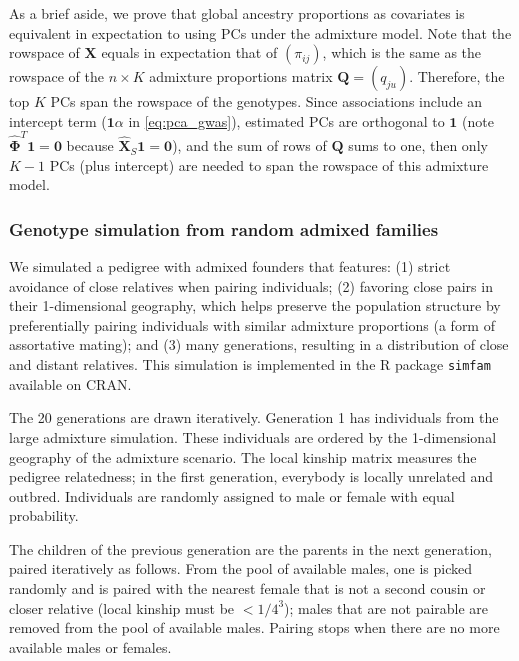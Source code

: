 \documentclass[11pt]{article}
\begin{document}
As a brief aside, we prove that global ancestry proportions as covariates is equivalent in expectation to using PCs under the admixture model.
Note that the rowspace of $\mathbf{X}$ equals in expectation that of $(\pi_{ij})$, which is the same as the rowspace of the $n \times K$ admixture proportions matrix $\mathbf{Q} = (q_{ju})$.
Therefore, the top $K$ PCs span the rowspace of the genotypes.
Since associations include an intercept term ($\mathbf{1} \alpha$ in \cref{eq:pca_gwas}), estimated PCs are orthogonal to $\mathbf{1}$ (note $\mathbf{\hat{\Phi}}^T \mathbf{1} = \mathbf{0}$ because $\mathbf{\hat{X}}_S \mathbf{1} = \mathbf{0}$), and the sum of rows of $\mathbf{Q}$ sums to one, then only $K-1$ PCs (plus intercept) are needed to span the rowspace of this admixture model.

\subsubsection{Genotype simulation from random admixed families}

We simulated a pedigree with admixed founders that features:
(1) strict avoidance of close relatives when pairing individuals;
(2) favoring close pairs in their 1-dimensional geography, which helps preserve the population structure by preferentially pairing individuals with similar admixture proportions (a form of assortative mating); and
(3) many generations, resulting in a distribution of close and distant relatives.
This simulation is implemented in the R package \texttt{simfam} available on CRAN.

The 20 generations are drawn iteratively.
Generation 1 has individuals from the large admixture simulation.
These individuals are ordered by the 1-dimensional geography of the admixture scenario.
The local kinship matrix measures the pedigree relatedness; in the first generation, everybody is locally unrelated and outbred.
Individuals are randomly assigned to male or female with equal probability.

The children of the previous generation are the parents in the next generation, paired iteratively as follows.
From the pool of available males, one is picked randomly and is paired with the nearest female that is not a second cousin or closer relative (local kinship must be $< 1/4^3$); males that are not pairable are removed from the pool of available males.
Pairing stops when there are no more available males or females.
\end{document}
